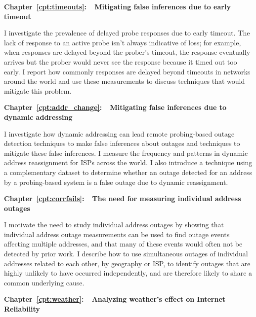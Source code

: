\textbf{Chapter~\ref{cpt:timeouts}:~~Mitigating false inferences due
to early timeout} 

I investigate the
prevalence of delayed probe responses due to early timeout. The lack
of response to an active probe isn't always indicative of loss; for
example, when responses are delayed beyond the prober's timeout, the
response eventually arrives but the prober would never see the
response because it timed out too early. I report how commonly
responses are delayed beyond timeouts in networks around the world and
use these measurements to discuss techniques that would mitigate this problem.

\textbf{Chapter~\ref{cpt:addr_change}:~~Mitigating false inferences due to dynamic addressing} 

I investigate how dynamic addressing can lead remote probing-based
outage detection techniques to make false inferences about outages and
techniques to mitigate these false inferences. I measure the frequency
and patterns in dynamic address reassignment for ISPs across the
world.  I also introduce a technique using a complementary dataset to
determine whether an outage detected for an address by a probing-based
system is a false outage due to dynamic reassignment. %

\textbf{Chapter~\ref{cpt:corrfails}:~~The need for measuring individual address outages} 

I motivate the need to study individual address outages by showing
that individual address outage measurements can be used to find outage
events affecting multiple addresses, and that many of these events
would often not be detected by prior work. I describe how to use
simultaneous outages of individual addresses related to each other, by
geography or ISP, to identify outages that are highly unlikely to have
occurred independently, and are therefore likely to share a common
underlying cause.

\textbf{Chapter~\ref{cpt:weather}:~~Analyzing weather's effect on
  Internet Reliability} 

